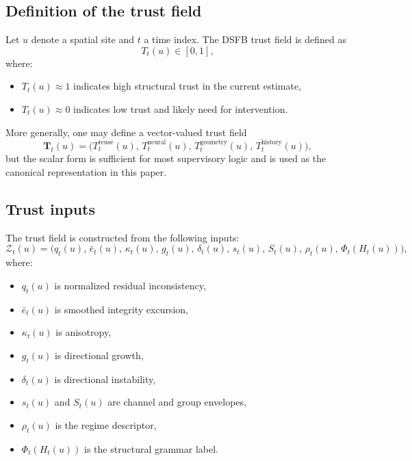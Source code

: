 \documentclass[11pt]{article}
\theoremstyle{definition}
\theoremstyle{plain}
\begin{document}
\subsection{Definition of the trust field}

Let $u$ denote a spatial site and $t$ a time index. The DSFB trust field is defined as
\begin{equation}
T_t(u)\in[0,1],
\end{equation}
where:
\begin{itemize}[leftmargin=1.5em]
    \item $T_t(u)\approx 1$ indicates high structural trust in the current estimate,
    \item $T_t(u)\approx 0$ indicates low trust and likely need for intervention.
\end{itemize}

More generally, one may define a vector-valued trust field
\begin{equation}
\mathbf{T}_t(u)=\bigl(T^{\mathrm{reuse}}_t(u),\,T^{\mathrm{neural}}_t(u),\,T^{\mathrm{geometry}}_t(u),\,T^{\mathrm{history}}_t(u)\bigr),
\end{equation}
but the scalar form is sufficient for most supervisory logic and is used as the canonical representation in this paper.


\subsection{Trust inputs}

The trust field is constructed from the following inputs:
\begin{equation}
\mathcal{Z}_t(u)=
\bigl(
q_t(u),\,
\bar e_t(u),\,
\kappa_t(u),\,
g_t(u),\,
\delta_t(u),\,
s_t(u),\,
S_t(u),\,
\rho_t(u),\,
\Phi_t(H_t(u))
\bigr),
\end{equation}
where:
\begin{itemize}[leftmargin=1.5em]
    \item $q_t(u)$ is normalized residual inconsistency,
    \item $\bar e_t(u)$ is smoothed integrity excursion,
    \item $\kappa_t(u)$ is anisotropy,
    \item $g_t(u)$ is directional growth,
    \item $\delta_t(u)$ is directional instability,
    \item $s_t(u)$ and $S_t(u)$ are channel and group envelopes,
    \item $\rho_t(u)$ is the regime descriptor,
    \item $\Phi_t(H_t(u))$ is the structural grammar label.
\end{itemize}
\end{document}
